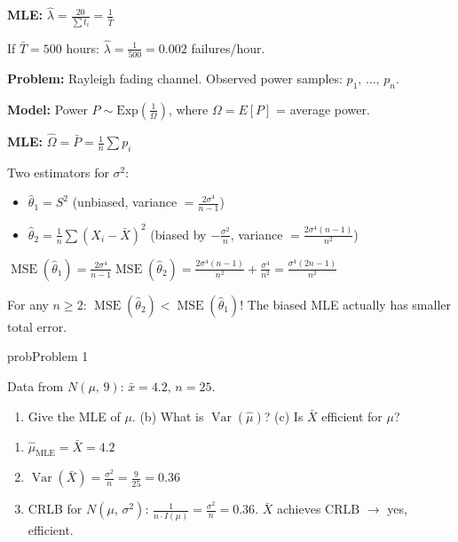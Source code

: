 \textbf{MLE:} $\hat{\lambda} = \frac{20}{\sum t_{i}} = \frac{1}{\bar{T}}$

If $\bar{T} = 500$ hours: $\hat{\lambda} = \frac{1}{500} = 0.002$ failures/hour.


\textbf{Problem:} Rayleigh fading channel. Observed power samples: $p_{1},\, \ldots,\, p_{n}$.

\textbf{Model:} Power $P \sim \mathrm{Exp}\left(\frac{1}{\Omega}\right)$, where $\Omega = E[P]$ = average power.

\textbf{MLE:} $\hat{\Omega} = \bar{P} = \frac{1}{n}\sum p_{i}$



Two estimators for $\sigma^{2}$:

\begin{itemize}
\tightlist
\item
  $\hat{\theta}_{1} = S^{2}$ (unbiased, variance $= \frac{2\sigma^{4}}{n-1}$)
\item
  $\hat{\theta}_{2} = \frac{1}{n}\sum (X_{i}-\bar{X})^{2}$ (biased by $-\frac{\sigma^{2}}{n}$, variance $= \frac{2\sigma^{4}(n-1)}{n^{2}}$)
\end{itemize}

$\displaystyle \operatorname{MSE}(\hat{\theta}_{1}) = \frac{2\sigma^{4}}{n-1}$\PSbr{}$\displaystyle \operatorname{MSE}(\hat{\theta}_{2}) = \frac{2\sigma^{4}(n-1)}{n^{2}} + \frac{\sigma^{4}}{n^{2}} = \frac{\sigma^{4}(2n-1)}{n^{2}}$

For any $n \ge 2$: $\operatorname{MSE}(\hat{\theta}_{2}) < \operatorname{MSE}(\hat{\theta}_{1})$! The biased MLE actually has smaller total error.


\begin{PSbox}[unbreakable]{prob}{Problem 1}

Data from $N(\mu,\, 9)$: $\bar{x} = 4.2,\, n = 25$.

\begin{enumerate}
\def\labelenumi{(\alph{enumi})}
\tightlist
\item
  Give the MLE of $\mu$. (b) What is $\operatorname{Var}(\hat{\mu})$? (c) Is $\bar{X}$ efficient for $\mu$?
\end{enumerate}

\PSsolution{} 

\begin{enumerate}
\def\labelenumi{(\alph{enumi})}
\tightlist
\item
  $\hat{\mu}_{\mathrm{MLE}} = \bar{X} = 4.2$
\item
  $\displaystyle \operatorname{Var}(\bar{X}) = \frac{\sigma^{2}}{n} = \frac{9}{25} = 0.36$
\item
  CRLB for $N(\mu,\,\sigma^{2})$: $\frac{1}{n \cdot I(\mu)} = \frac{\sigma^{2}}{n} = 0.36$. $\bar{X}$ achieves $\mathrm{CRLB}$ \ensuremath{\to} yes, efficient.
\end{enumerate}

\end{PSbox}

